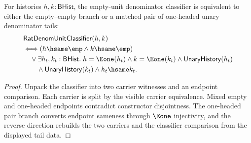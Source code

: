 \begin{theorem}
\label{thm:rat-denom-unit-classifier-visible-cases-iff}
For histories $h,k:\mathsf{BHist}$, the empty-unit denominator classifier is
equivalent to either the empty--empty branch or a matched pair of one-headed
unary denominator tails:
$$
\begin{aligned}
&\mathsf{RatDenomUnitClassifier}(h,k)\\
&\Longleftrightarrow
\left(h\hsame\emp\land k\hsame\emp\right)\\
&\quad{}\lor
\exists h_t,k_t:\mathsf{BHist}.\;
h=\Eone(h_t)\land k=\Eone(k_t)\land \mathsf{UnaryHistory}(h_t)\\
&\qquad{}\land \mathsf{UnaryHistory}(k_t)\land h_t\hsame k_t.
\end{aligned}
$$
\end{theorem}
\begin{proof}
Unpack the classifier into two carrier witnesses and an endpoint comparison.
Each carrier is split by the visible carrier equivalence. Mixed empty and
one-headed endpoints contradict constructor disjointness. The one-headed pair
branch converts endpoint sameness through $\Eone$ injectivity, and the reverse
direction rebuilds the two carriers and the classifier comparison from the
displayed tail data.
\end{proof}

